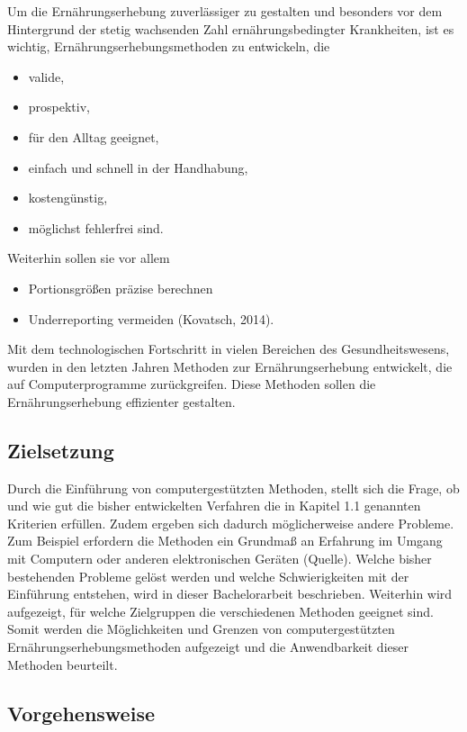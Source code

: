 Um die Ernährungserhebung zuverlässiger zu gestalten und besonders vor dem Hintergrund der stetig wachsenden Zahl ernährungsbedingter Krankheiten, ist es wichtig, Ernährungserhebungsmethoden zu entwickeln, die 
\begin{itemize}
\item valide,
\item prospektiv,
\item für den Alltag geeignet,
\item einfach und schnell in der Handhabung,
\item kostengünstig,
\item möglichst fehlerfrei sind.
\end{itemize}

Weiterhin sollen sie vor allem
\begin{itemize}
\item Portionsgrößen präzise berechnen
\item Underreporting vermeiden (Kovatsch, 2014).
\end{itemize}

Mit dem technologischen Fortschritt in vielen Bereichen des Gesundheitswesens, wurden in den letzten Jahren Methoden zur Ernährungserhebung entwickelt, die auf Computerprogramme zurückgreifen. Diese Methoden sollen die Ernährungserhebung effizienter gestalten. 


\subsection{Zielsetzung}

Durch die Einführung von computergestützten Methoden, stellt sich die Frage, ob und wie gut die bisher entwickelten Verfahren die in Kapitel 1.1 genannten Kriterien erfüllen. Zudem ergeben sich dadurch möglicherweise andere Probleme. Zum Beispiel erfordern die Methoden ein Grundmaß an Erfahrung im Umgang mit Computern oder anderen elektronischen Geräten (Quelle). Welche bisher bestehenden Probleme gelöst werden und welche Schwierigkeiten mit der Einführung entstehen, wird in dieser Bachelorarbeit beschrieben. Weiterhin wird aufgezeigt, für welche Zielgruppen die verschiedenen Methoden geeignet sind.
Somit werden die Möglichkeiten und Grenzen von computergestützten Ernährungserhebungsmethoden aufgezeigt und die Anwendbarkeit dieser Methoden beurteilt. 

\subsection{Vorgehensweise}

